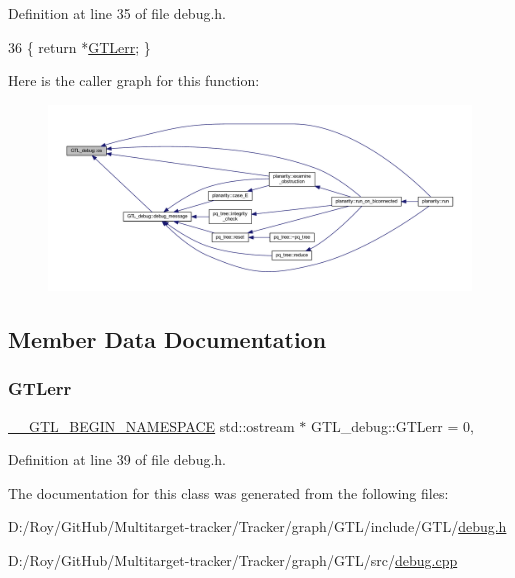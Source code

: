 Definition at line 35 of file debug.\+h.


\begin{DoxyCode}
36     \{ \textcolor{keywordflow}{return} *\mbox{\hyperlink{class_g_t_l__debug_a342e76e2d4f128a29548aae14172db45}{GTLerr}}; \}
\end{DoxyCode}
Here is the caller graph for this function\+:\nopagebreak
\begin{figure}[H]
\begin{center}
\leavevmode
\includegraphics[width=350pt]{class_g_t_l__debug_a40282dee89c7cd8ea6bd02856e6cd73f_icgraph}
\end{center}
\end{figure}


\subsection{Member Data Documentation}
\mbox{\label{class_g_t_l__debug_a342e76e2d4f128a29548aae14172db45}} 
\subsubsection{\texorpdfstring{G\+T\+Lerr}{GTLerr}}
{\footnotesize\ttfamily \mbox{\hyperlink{_g_t_l_8h_a2d9f24096ac60918452dd51f32b64aa9}{\+\_\+\+\_\+\+G\+T\+L\+\_\+\+B\+E\+G\+I\+N\+\_\+\+N\+A\+M\+E\+S\+P\+A\+CE}} std\+::ostream $\ast$ G\+T\+L\+\_\+debug\+::\+G\+T\+Lerr = 0\hspace{0.3cm}{\ttfamily [static]}, {\ttfamily [private]}}



Definition at line 39 of file debug.\+h.



The documentation for this class was generated from the following files\+:\begin{DoxyCompactItemize}
\item 
D\+:/\+Roy/\+Git\+Hub/\+Multitarget-\/tracker/\+Tracker/graph/\+G\+T\+L/include/\+G\+T\+L/\mbox{\hyperlink{debug_8h}{debug.\+h}}\item 
D\+:/\+Roy/\+Git\+Hub/\+Multitarget-\/tracker/\+Tracker/graph/\+G\+T\+L/src/\mbox{\hyperlink{debug_8cpp}{debug.\+cpp}}\end{DoxyCompactItemize}
